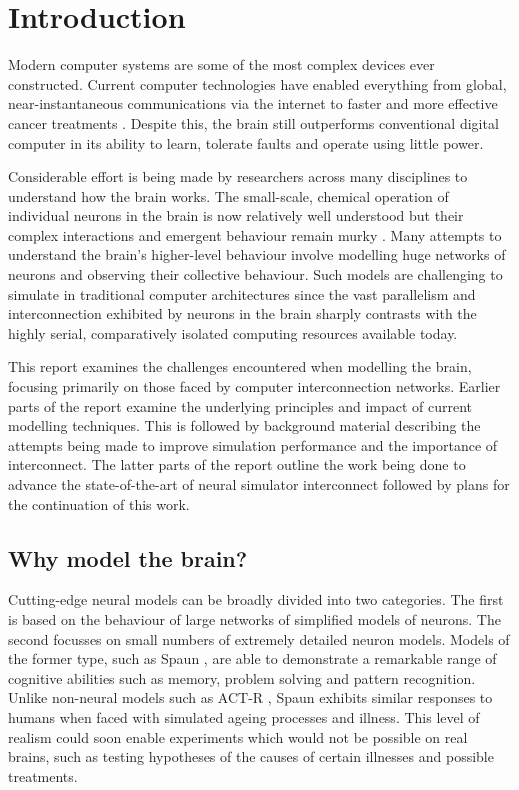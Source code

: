 \chapter{Introduction}
	
	Modern computer systems are some of the most complex devices ever constructed.
	Current computer technologies have enabled everything from global,
	near-instantaneous communications via the internet to faster and more
	effective cancer treatments \cite{nassif}. Despite this, the brain still
	outperforms conventional digital computer in its ability to learn, tolerate
	faults and operate using little power.
	
	Considerable effort is being made by researchers across many disciplines to
	understand how the brain works. The small-scale, chemical operation of
	individual neurons in the brain is now relatively well understood but their
	complex interactions and emergent behaviour remain murky \cite{dayan03}. Many
	attempts to understand the brain's higher-level behaviour involve modelling
	huge networks of neurons and observing their collective behaviour.  Such
	models are challenging to simulate in traditional computer architectures since
	the vast parallelism and interconnection exhibited by neurons in the brain
	sharply contrasts with the highly serial, comparatively isolated computing
	resources available today.
	
	This report examines the challenges encountered when modelling the brain,
	focusing primarily on those faced by computer interconnection networks.
	Earlier parts of the report examine the underlying principles and impact of
	current modelling techniques. This is followed by background material
	describing the attempts being made to improve simulation performance and the
	importance of interconnect. The latter parts of the report outline the work
	being done to advance the state-of-the-art of neural simulator interconnect
	followed by plans for the continuation of this work.
	
	\section{Why model the brain?}
	
		Cutting-edge neural models can be broadly divided into two categories. The
		first is based on the behaviour of large networks of simplified models of
		neurons.  The second focusses on small numbers of extremely detailed neuron
		models.  Models of the former type, such as Spaun \cite{eliasmith12}, are
		able to demonstrate a remarkable range of cognitive abilities such as
		memory, problem solving and pattern recognition. Unlike non-neural models
		such as ACT-R \cite{anderson93}, Spaun exhibits similar responses to humans
		when faced with simulated ageing processes and illness. This level of
		realism could soon enable experiments which would not be possible on real
		brains, such as testing hypotheses of the causes of certain illnesses and
		possible treatments.
		
